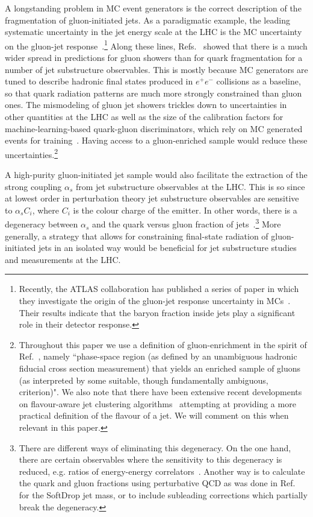 \documentclass[a4paper,11pt]{article}
\begin{document}
A longstanding problem in MC event generators is the correct description of the fragmentation of gluon-initiated jets. As a paradigmatic example, the leading systematic uncertainty in the jet energy scale at the LHC is the MC uncertainty on the gluon-jet response~\cite{ATLAS:2020cli,CMS:2016lmd, CMS-DP-2020-019}.\footnote{Recently, the ATLAS collaboration has published a series of paper in which they investigate the origin of the gluon-jet response uncertainty in MCs~\cite{ATL-PHYS-PUB-2022-021,ATLAS:2024kkj, ATLAS:2024png}. Their results indicate that the baryon fraction inside jets play a significant role in their detector response.}  Along these lines, Refs.~\cite{Andersen:2016qtm, Gras:2017jty} showed that there is a much wider spread in predictions for gluon showers than for quark fragmentation for a number of jet substructure observables. This is mostly because MC generators are tuned to describe hadronic final states produced in $e^+e^-$ collisions as a baseline, so that quark radiation patterns are much more strongly constrained than gluon ones. The mismodeling of gluon jet showers trickles down to uncertainties in other quantities at the LHC as well as the size of the calibration factors for machine-learning-based quark-gluon discriminators, which rely on MC generated events for training~\cite{ATLAS:2014vax}. Having access to a gluon-enriched sample would reduce these uncertainties.\footnote{Throughout this paper we use a definition of gluon-enrichment in the spirit of Ref.~\cite{Andersen:2016qtm, Gras:2017jty}, namely ``phase-space region (as defined by an unambiguous hadronic fiducial cross section measurement) that yields an enriched sample of gluons (as interpreted by some suitable, though fundamentally ambiguous, criterion)". We also note that there have been extensive recent developments on flavour-aware jet clustering algorithms~\cite{Caletti:2022hnc,Czakon:2022wam,Gauld:2022lem,Caola:2023wpj} attempting at providing a more practical definition of the flavour of a jet. We will comment on this when relevant in this paper.}

A high-purity gluon-initiated jet sample would also facilitate the extraction of the strong coupling $\alpha_s$ from jet substructure observables at the LHC. This is so since at lowest order in perturbation theory jet substructure observables are sensitive to $\alpha_s C_i$, where $C_i$ is the colour charge of the emitter. In other words, there is a degeneracy between $\alpha_s$ and the quark versus gluon fraction of jets~\cite{Proceedings:2018jsb}.\footnote{There are different ways of eliminating this degeneracy. On the one hand, there are certain observables where the sensitivity to this degeneracy is reduced, e.g. ratios of energy-energy correlators~\cite{Chen:2020vvp,Chen:2024nyc,CMS:2024mlf,Lee:2024esz}. Another way is to calculate the quark and gluon fractions using perturbative QCD as was done in Ref.~\cite{Hannesdottir:2022rsl} for the SoftDrop jet mass, or to include subleading corrections which partially break the degeneracy.} More generally, a strategy that allows for constraining final-state radiation of gluon-initiated jets in an isolated way would be beneficial for jet substructure studies and measurements at the LHC.
\end{document}
